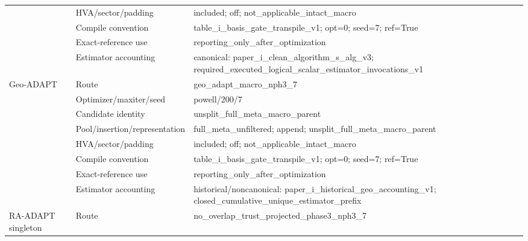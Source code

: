 \documentclass[10pt,letterpaper]{article}
\begin{document}
\begin{longtable}{@{}>{\raggedright\arraybackslash}p{0.9in}>{\raggedright\arraybackslash}p{1.65in}>{\raggedright\arraybackslash}p{4.7in}@{}}
 & HVA/sector/padding & included;\allowbreak{} off;\allowbreak{} not\_\allowbreak{}applicable\_\allowbreak{}intact\_\allowbreak{}macro \\
 & Compile convention & table\_\allowbreak{}i\_\allowbreak{}basis\_\allowbreak{}gate\_\allowbreak{}transpile\_\allowbreak{}v1;\allowbreak{} opt=0;\allowbreak{} seed=7;\allowbreak{} ref=True \\
 & Exact-reference use & reporting\_\allowbreak{}only\_\allowbreak{}after\_\allowbreak{}optimization \\
 & Estimator accounting & canonical:\allowbreak{} paper\_\allowbreak{}i\_\allowbreak{}clean\_\allowbreak{}algorithm\_\allowbreak{}s\_\allowbreak{}alg\_\allowbreak{}v3;\allowbreak{} required\_\allowbreak{}executed\_\allowbreak{}logical\_\allowbreak{}scalar\_\allowbreak{}estimator\_\allowbreak{}invocations\_\allowbreak{}v1 \\
\addlinespace[2pt]
Geo-ADAPT & Route & geo\_\allowbreak{}adapt\_\allowbreak{}macro\_\allowbreak{}nph3\_\allowbreak{}7 \\
 & Optimizer/maxiter/seed & powell/\allowbreak{}200/\allowbreak{}7 \\
 & Candidate identity & unsplit\_\allowbreak{}full\_\allowbreak{}meta\_\allowbreak{}macro\_\allowbreak{}parent \\
 & Pool/insertion/representation & full\_\allowbreak{}meta\_\allowbreak{}unfiltered;\allowbreak{} append;\allowbreak{} unsplit\_\allowbreak{}full\_\allowbreak{}meta\_\allowbreak{}macro\_\allowbreak{}parent \\
 & HVA/sector/padding & included;\allowbreak{} off;\allowbreak{} not\_\allowbreak{}applicable\_\allowbreak{}intact\_\allowbreak{}macro \\
 & Compile convention & table\_\allowbreak{}i\_\allowbreak{}basis\_\allowbreak{}gate\_\allowbreak{}transpile\_\allowbreak{}v1;\allowbreak{} opt=0;\allowbreak{} seed=7;\allowbreak{} ref=True \\
 & Exact-reference use & reporting\_\allowbreak{}only\_\allowbreak{}after\_\allowbreak{}optimization \\
 & Estimator accounting & historical/\allowbreak{}noncanonical:\allowbreak{} paper\_\allowbreak{}i\_\allowbreak{}historical\_\allowbreak{}geo\_\allowbreak{}accounting\_\allowbreak{}v1;\allowbreak{} closed\_\allowbreak{}cumulative\_\allowbreak{}unique\_\allowbreak{}estimator\_\allowbreak{}prefix \\
\addlinespace[2pt]
RA-ADAPT singleton & Route & no\_\allowbreak{}overlap\_\allowbreak{}trust\_\allowbreak{}projected\_\allowbreak{}phase3\_\allowbreak{}nph3\_\allowbreak{}7 \\

\end{longtable}
\end{document}
